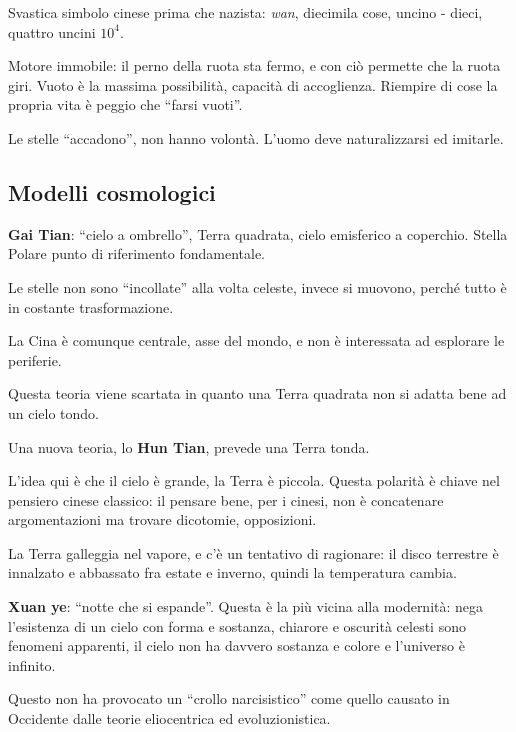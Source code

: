 \documentclass[main.tex]{subfiles}
\begin{document}

Svastica simbolo cinese prima che nazista: \emph{wan}, diecimila cose, uncino - dieci, quattro uncini \(10^{4}\).

Motore immobile: il perno della ruota sta fermo, e con ciò permette che la ruota giri. 
Vuoto è la massima possibilità, capacità di accoglienza.
Riempire di cose la propria vita è peggio che ``farsi vuoti''.

Le stelle ``accadono'', non hanno volontà. L'uomo deve naturalizzarsi ed imitarle. 

\subsection{Modelli cosmologici}

\textbf{Gai Tian}: ``cielo a ombrello'', Terra quadrata, cielo emisferico a coperchio. Stella Polare punto di riferimento fondamentale. 

Le stelle non sono ``incollate'' alla volta celeste, invece si muovono, perché tutto è in costante trasformazione. 

La Cina è comunque centrale, asse del mondo, e non è interessata ad esplorare le periferie. 

Questa teoria viene scartata in quanto una Terra quadrata non si adatta bene ad un cielo tondo. 

Una nuova teoria, lo \textbf{Hun Tian}, prevede una Terra tonda. 

L'idea qui è che il cielo è grande, la Terra è piccola.
Questa polarità è chiave nel pensiero cinese classico: il pensare bene, per i cinesi, non è concatenare argomentazioni ma trovare dicotomie, opposizioni. 

La Terra galleggia nel vapore, e c'è un tentativo di ragionare: il disco terrestre è innalzato e abbassato fra estate e inverno, quindi la temperatura cambia. 


\textbf{Xuan ye}: ``notte che si espande''. Questa è la più vicina alla modernità: nega l'esistenza di un cielo con forma e sostanza, chiarore e oscurità celesti sono fenomeni apparenti, il cielo non ha davvero sostanza e colore e l'universo è infinito. 

Questo non ha provocato un ``crollo narcisistico'' come quello causato  in Occidente dalle teorie eliocentrica ed evoluzionistica. 
\end{document}
